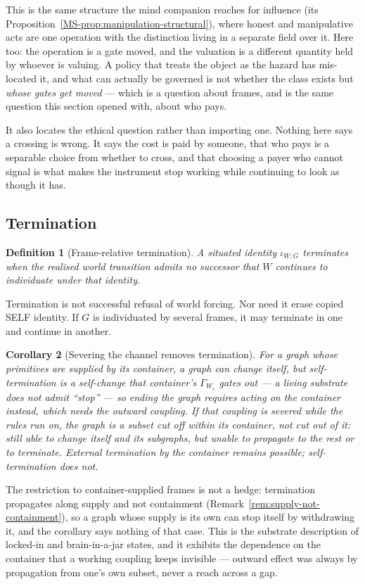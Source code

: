 \documentclass[11pt,a4paper]{article}
\newtheorem{definition}{Definition}[section]
\newtheorem{corollary}[definition]{Corollary}
\theoremstyle{remark}\newtheorem{remark}[definition]{Remark}
\begin{document}
This is the same structure the mind companion reaches for influence (its Proposition~\ref{MS-prop:manipulation-structural}), where honest and
manipulative acts are one operation with the distinction living in a separate field over it. Here too:
the operation is a gate moved, and the valuation is a different quantity held by whoever is valuing. A
policy that treats the object as the hazard has mis-located it, and what can actually be governed is not
whether the class exists but \emph{whose gates get moved} --- which is a question about frames, and is
the same question this section opened with, about who pays.

It also locates the ethical question rather than importing one. Nothing here says a crossing is wrong.
It says the cost is paid by someone, that who pays is a separable choice from whether to cross, and that
choosing a payer who cannot signal is what makes the instrument stop working while continuing to look as
though it has.

\subsection{Termination}\label{sec:termination}
\begin{definition}[Frame-relative termination]\label{def:frame-termination}
A situated identity $\iota_{W:G}$ terminates when the realised world transition admits no successor that $W$ continues to individuate under that identity.
\end{definition}
Termination is not successful refusal of world forcing. Nor need it erase copied SELF identity. If $G$ is individuated by several frames, it may terminate in one and continue in another.

\begin{corollary}[Severing the channel removes termination]\label{cor:locked-in}
For a graph whose primitives are supplied by its container, a graph can change itself, but self-\emph{termination} is a self-change that container's $\Gamma_{W_c}$ gates out --- a living substrate does not admit ``stop'' --- so ending the graph requires acting on the container instead, which needs the outward coupling. If that coupling is severed while the rules run on, the graph is a subset cut \emph{off} within its container, not cut out of it: still able to change itself and its subgraphs, but unable to propagate to the rest or to terminate. External termination by the container remains possible; self-termination does not.
\end{corollary}
The restriction to container-supplied frames is not a hedge: termination propagates along supply and not containment (Remark~\ref{rem:supply-not-containment}), so a graph whose supply is its own can stop itself by withdrawing it, and the corollary says nothing of that case. This is the substrate description of locked-in and brain-in-a-jar states, and it exhibits the dependence on the container that a working coupling keeps invisible --- outward effect was always by propagation from one's own subset, never a reach across a gap.
\end{document}
